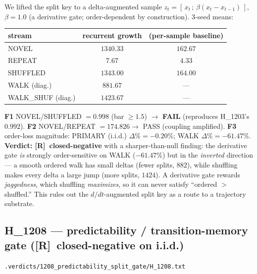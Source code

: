 \documentclass[11pt,a4paper]{article}
\providecommand{\tierRed}{\textbf{[R]}}
\newcommand{\verdict}[1]{\texttt{\small #1}}
\begin{document}
We lifted the split key to a delta-augmented sample
$z_t = [\,x_t \,;\, \beta(x_t - x_{t-1})\,]$, $\beta=1.0$ (a derivative gate;
order-dependent by construction). $3$-seed means:
\begin{center}
\begin{tabular}{lcc}
\toprule
stream & recurrent growth & (per-sample baseline) \\
\midrule
NOVEL    & $1340.33$ & $162.67$ \\
REPEAT   & $7.67$    & $4.33$ \\
SHUFFLED & $1343.00$ & $164.00$ \\
WALK (diag.)      & $881.67$  & --- \\
WALK\_SHUF (diag.) & $1423.67$ & --- \\
\bottomrule
\end{tabular}
\end{center}
\textbf{F1} NOVEL/SHUFFLED $=0.998$ (bar $\ge 1.5$) $\to$ \textbf{FAIL}
(reproduces H\_1203's $0.992$). \textbf{F2} NOVEL/REPEAT $=174.826 \to$ PASS
(coupling amplified). \textbf{F3} order-loss magnitude: PRIMARY (i.i.d.)
$\Delta\% = -0.20\%$; WALK $\Delta\% = -61.47\%$. \textbf{Verdict: \tierRed\
closed-negative} with a sharper-than-null finding: the derivative gate \emph{is}
strongly order-sensitive on WALK ($-61.47\%$) but in the \emph{inverted}
direction --- a smooth ordered walk has small deltas (fewer splits, $882$),
while shuffling makes every delta a large jump (more splits, $1424$). A
derivative gate rewards \emph{jaggedness}, which shuffling \emph{maximizes}, so
it can never satisfy ``ordered $>$ shuffled.'' This rules out the
$d/dt$-augmented split key as a route to a trajectory substrate.

\subsection{H\_1208 --- predictability / transition-memory gate (\tierRed\ closed-negative on i.i.d.)}
\noindent\verdict{.verdicts/1208\_predictability\_split\_gate/H\_1208.txt}
\end{document}
